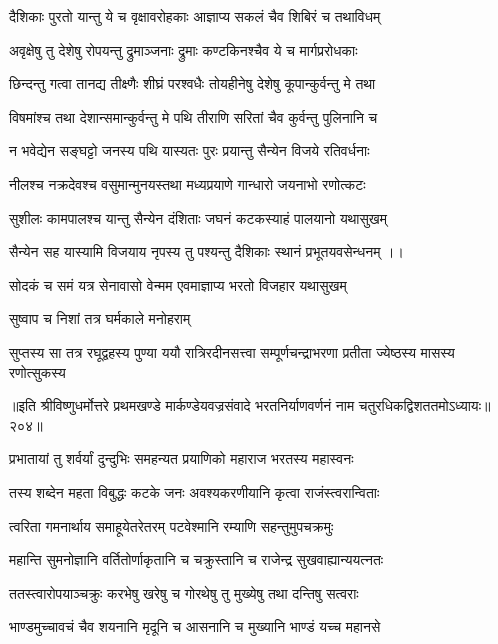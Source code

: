\twolineshloka
{दैशिकाः पुरतो यान्तु ये च वृक्षावरोहकाः}
{आज्ञाप्य सकलं चैव शिबिरं च तथाविधम्}%

\twolineshloka
{अवृक्षेषु तु देशेषु रोपयन्तु द्रुमाञ्जनाः}
{द्रुमाः कण्टकिनश्चैव ये च मार्गप्ररोधकाः}%

\twolineshloka
{छिन्दन्तु गत्वा तानद्य तीक्ष्णैः शीघ्रं परश्वधैः}
{तोयहीनेषु देशेषु कूपान्कुर्वन्तु मे तथा}%

\twolineshloka
{विषमांश्च तथा देशान्समान्कुर्वन्तु मे पथि}
{तीराणि सरितां चैव कुर्वन्तु पुलिनानि च}%

\twolineshloka
{न भवेद्येन सङ्घट्टो जनस्य पथि यास्यतः}
{पुरः प्रयान्तु सैन्येन विजये रतिवर्धनाः}%

\twolineshloka
{नीलश्च नक्रदेवश्च वसुमान्मुनयस्तथा}
{मध्यप्रयाणे गान्धारो जयनाभो रणोत्कटः}%

\twolineshloka
{सुशीलः कामपालश्च यान्तु सैन्येन दंशिताः}
{जघनं कटकस्याहं पालयानो यथासुखम्}%

\twolineshloka
{सैन्येन सह यास्यामि विजयाय नृपस्य तु}
{पश्यन्तु दैशिकाः स्थानं प्रभूतयवसेन्धनम् ।।}%

\twolineshloka
{सोदकं च समं यत्र सेनावासो वेन्मम}
{एवमाज्ञाप्य भरतो विजहार यथासुखम्} %

\onelineshloka
{सुष्वाप च निशां तत्र घर्मकाले मनोहराम्}%

\twolineshloka
{सुप्तस्य सा तत्र रघूद्वहस्य पुण्या ययौ रात्रिरदीनसत्त्वा}
{सम्पूर्णचन्द्राभरणा प्रतीता ज्येष्ठस्य मासस्य रणोत्सुकस्य}%

॥इति श्रीविष्णुधर्मोत्तरे प्रथमखण्डे मार्कण्डेयवज्रसंवादे भरतनिर्याणवर्णनं नाम चतुरधिकद्विशततमोऽध्यायः॥२०४॥



\twolineshloka
{प्रभातायां तु शर्वर्यां दुन्दुभिः समहन्यत}
{प्रयाणिको महाराज भरतस्य महास्वनः}%

\twolineshloka
{तस्य शब्देन महता विबुद्धः कटके जनः}
{अवश्यकरणीयानि कृत्वा राजंस्त्वरान्विताः}%

\twolineshloka
{त्वरिता गमनार्थाय समाहूयेतरेतरम्}
{पटवेश्मानि रम्याणि सहन्तुमुपचक्रमुः}%

\twolineshloka
{महान्ति सुमनोज्ञानि वर्तितोर्णाकृतानि च}
{चक्रुस्तानि च राजेन्द्र सुखवाह्यान्ययत्नतः}%

\twolineshloka
{ततस्त्वारोपयाञ्चक्रुः करभेषु खरेषु च}
{गोरथेषु तु मुख्येषु तथा दन्तिषु सत्वराः}%

\twolineshloka
{भाण्डमुच्चावचं चैव शयनानि मृदूनि च}
{आसनानि च मुख्यानि भाण्डं यच्च महानसे}%

